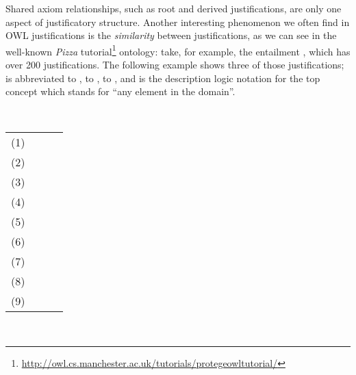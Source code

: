 Shared axiom relationships, such as root and derived justifications, are only one aspect of justificatory structure. Another interesting phenomenon we often find in OWL justifications is the \emph{similarity} between justifications, as we can see in the well-known \emph{Pizza} tutorial\footnote{\url{http://owl.cs.manchester.ac.uk/tutorials/protegeowltutorial/}} ontology: take, for example, the entailment , which has over 200 justifications. The following example shows three of those justifications;  is abbreviated to ,  to ,  to , and \thing is the description logic notation for the top concept  which stands for \enquote{any element in the domain}.
\begin{examp}
~\newline ~\newline
\footnotesize
\begin{tabu}{rlll}
(1) &  &   &  \\
(2) & &   &    \\
(3) & &   &    \\
(4) & &   &   \\
(5) & &    &     \\
(6) & &   &    \\
(7) & &    &     \\
(8) & &    &      \\
(9) &  &   &   
\end{tabu}
~\newline
\end{examp}

